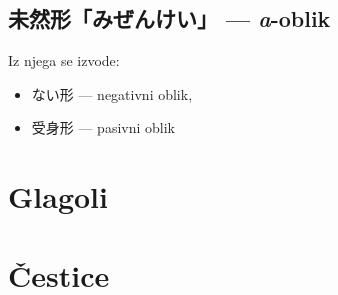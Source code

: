\documentclass[a4paper, 12pt]{amsart}
\begin{document}
  \subsection{未然形「みぜんけい」 --- \textit{a}-oblik}
  Iz njega se izvode:
  \begin{itemize}
  	\item ない形 --- negativni oblik,
    \item 受身形 --- pasivni oblik
  \end{itemize}

  \section{Glagoli}
  \section{Čestice}
  
\end{document}
